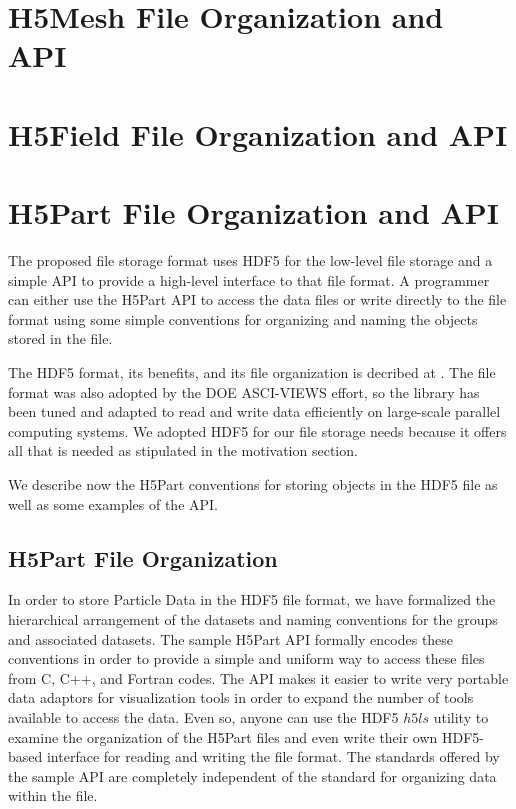 \documentclass[acus]{JAC2003}
\begin{document}
\section{H5Mesh File Organization and API}
 
\section{H5Field File Organization and API}

\section{H5Part File Organization and API}
The proposed file storage format uses HDF5 for the low-level file
storage and a simple API to provide a high-level interface to that
file format.  A programmer can either use the H5Part API to access
the data files or write directly to the file format using some simple
conventions for organizing and naming the objects stored in the
file.

The HDF5 format, its benefits, and its file organization is decribed
at \cite{hdf5hp}.  The file format was also adopted by the DOE
ASCI-VIEWS effort, so the library has been tuned and adapted to read
and write data efficiently on large-scale parallel computing
systems. We adopted HDF5 for our file storage needs because it offers
all that is needed as stipulated in the motivation section.

We describe now the H5Part conventions for storing
objects in the HDF5 file as well as some examples of the API.
\subsection{H5Part File Organization}
In order to store Particle Data in the HDF5 file format, we have
formalized the hierarchical arrangement of the datasets and naming 
conventions for the groups and associated datasets.  The sample H5Part API formally 
encodes these conventions in order to provide a simple and uniform
way to access these files from C, C++, and Fortran codes.  The API makes
it easier to write very portable data adaptors for visualization tools in order to
expand the number of tools available to access the data.  Even so,
anyone can use the HDF5 $h5ls$ utility to examine the organization 
of the H5Part files and even write their own HDF5-based interface for reading and writing the
file format. The standards offered by the sample API are completely independent of the
standard for organizing data within the file.
\end{document}
